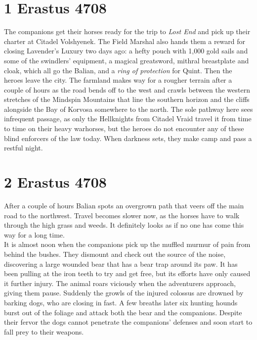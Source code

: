 \section{1 Erastus 4708}

The companions get their horses ready for the trip to {\itshape Lost End} and pick up their charter at Citadel Volshyenek. The Field Marshal also hands them a reward for closing Lavender's Luxury two days ago: a hefty pouch with 1,000 gold sails and some of the swindlers' equipment, a magical greatsword, mithral breastplate and cloak, which all go the Balian, and a  {\itshape ring of protection} for Quint. Then the heroes leave the city. The farmland makes way for a rougher terrain after a couple of hours as the road bends off to the west and crawls between the western stretches of the Mindspin Mountains that line the southern horizon and the cliffs alongside the Bay of Korvosa somewhere to the north. The sole pathway here sees infrequent passage, as only the Hellknights from Citadel Vraid travel it from time to time on their heavy warhorses, but the heroes do not encounter any of these blind enforcers of the law today. When darkness sets, they make camp and pass a restful night.\\

\section{2 Erastus 4708}

After a couple of hours Balian spots an overgrown path that veers off the main road to the northwest. Travel becomes slower now, as the horses have to walk through the high grass and weeds. It definitely looks as if no one has come this way for a long time.\\

It is almost noon when the companions pick up the muffled murmur of pain from behind the bushes. They dismount and check out the source of the noise, discovering a large wounded bear that has a bear trap around its paw. It has been pulling at the iron teeth to try and get free, but its efforts have only caused it further injury. The animal roars viciously when the adventurers approach, giving them pause. Suddenly the growls of the injured colossus are drowned by barking dogs, who are closing in fast. A few breaths later six hunting hounds burst out of the foliage and attack both the bear and the companions. Despite their fervor the dogs cannot penetrate the companions' defenses and soon start to fall prey to their weapons.\\

